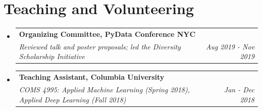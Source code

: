 \documentclass[a4paper,20pt]{article}
\makeatletter
\newcommand{\resumeSubheading}[4]{
  \vspace{-1pt}\item
    \begin{tabular*}{0.97\textwidth}{l@{\extracolsep{\fill}}r}
      \textbf{#1} & \textit{#2} \\
      \textit{#3} & \textit{#4} \\
    \end{tabular*}\vspace{-5pt}
}
\newcommand{\resumeSubHeadingListStart}{\begin{itemize}[leftmargin=*]}
\newcommand{\resumeSubHeadingListEnd}{\end{itemize}}
\makeatother
\begin{document}
\section{Teaching and Volunteering}
  \resumeSubHeadingListStart
    \resumeSubheading
      {Organizing Committee, PyData Conference NYC}{}
      {Reviewed talk and poster proposals; led the Diversity Scholarship Initiative}{Aug 2019 - Nov 2019}
    \resumeSubheading
      {Teaching Assistant, Columbia University}{}
      {COMS 4995: Applied Machine Learning (Spring 2018), Applied Deep Learning (Fall 2018)}{Jan - Dec 2018}
  \resumeSubHeadingListEnd
\end{document}
